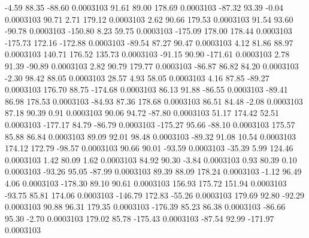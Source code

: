        -4.59       88.35      -88.60     0.0003103
       91.61       89.00      178.69     0.0003103
      -87.32       93.39       -0.04     0.0003103
       90.71        2.71      179.12     0.0003103
        2.62       90.66      179.53     0.0003103
       91.54       93.60      -90.78     0.0003103
     -150.80        8.23       59.75     0.0003103
     -175.09      178.00      178.44     0.0003103
     -175.73      172.16     -172.88     0.0003103
      -89.54       87.27       90.47     0.0003103
        4.12       81.86       88.97     0.0003103
      140.71      176.52      135.73     0.0003103
      -91.15       90.90     -171.61     0.0003103
        2.78       91.39      -90.89     0.0003103
        2.82       90.79      179.77     0.0003103
      -86.87       86.82       84.20     0.0003103
       -2.30       98.42       88.05     0.0003103
       28.57        4.93       58.05     0.0003103
        4.16       87.85      -89.27     0.0003103
      176.70       88.75     -174.68     0.0003103
       86.13       91.88      -86.55     0.0003103
      -89.41       86.98      178.53     0.0003103
      -84.93       87.36      178.68     0.0003103
       86.51       84.48       -2.08     0.0003103
       87.18       90.39        0.91     0.0003103
       90.06       94.72      -87.80     0.0003103
       51.17      174.42       52.51     0.0003103
     -177.17       84.79      -86.79     0.0003103
     -175.27       95.66      -88.10     0.0003103
      175.57       85.88       86.84     0.0003103
       89.09       92.01       98.48     0.0003103
      -89.32       91.08       10.54     0.0003103
      174.12      172.79      -98.57     0.0003103
       90.66       90.01      -93.59     0.0003103
      -35.39        5.99      124.46     0.0003103
        1.42       80.09        1.62     0.0003103
       84.92       90.30       -3.84     0.0003103
        0.93       80.39        0.10     0.0003103
      -93.26       95.05      -87.99     0.0003103
       89.39       88.09      178.24     0.0003103
       -1.12       96.49        4.06     0.0003103
     -178.30       89.10       90.61     0.0003103
      156.93      175.72      151.94     0.0003103
      -93.75       85.81      174.06     0.0003103
     -146.79      172.83      -55.26     0.0003103
      179.69       92.80      -92.29     0.0003103
       90.88       96.31      179.35     0.0003103
     -176.39       85.23       86.38     0.0003103
      -86.66       95.30       -2.70     0.0003103
      179.02       85.78     -175.43     0.0003103
      -87.54       92.99     -171.97     0.0003103
